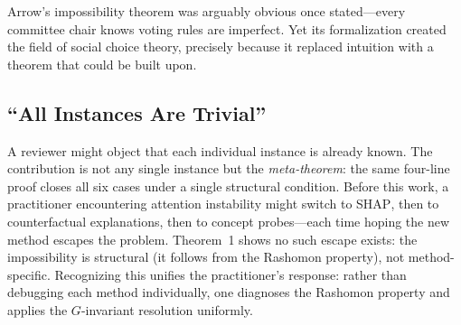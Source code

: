 \documentclass{article}
\newcommand{\SHAP}{\textsc{SHAP}}
\begin{document}
Arrow's impossibility theorem \citep{arrow1951social} was arguably obvious once stated---every committee chair knows voting rules are imperfect.  Yet its formalization created the field of social choice theory, precisely because it replaced intuition with a theorem that could be built upon.

\subsection{``All Instances Are Trivial''}

A reviewer might object that each individual instance is already known.  The contribution is not any single instance but the \emph{meta-theorem}: the same four-line proof closes all six cases under a single structural condition.  Before this work, a practitioner encountering attention instability might switch to \SHAP{}, then to counterfactual explanations, then to concept probes---each time hoping the new method escapes the problem.  Theorem~1 shows no such escape exists: the impossibility is structural (it follows from the Rashomon property), not method-specific.  Recognizing this unifies the practitioner's response: rather than debugging each method individually, one diagnoses the Rashomon property and applies the $G$-invariant resolution uniformly.



\end{document}
